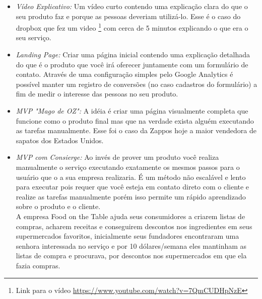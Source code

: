 \begin{itemize}
\item \emph{ Vídeo Explicativo:}
Um vídeo curto contendo uma explicação clara do que o seu produto faz e porque as pessoas deveriam utilizá-lo. Esse é o caso do dropbox que fez um video \footnote{Link para o vídeo  \url{https://www.youtube.com/watch?v=7QmCUDHpNzE}} com cerca de 5 minutos explicando o que era o seu serviço.
\item \emph{Landing Page:}
Criar uma página inicial contendo uma explicação detalhada do que é o produto que você irá oferecer juntamente com um formulário de contato. Através de uma configuração simples pelo Google Analytics é possível manter um registro de conversões (no caso cadastros do formulário)  a fim de medir o interesse das pessoas no seu produto.
\item \emph{MVP "Mago de OZ":}
A idéia é criar uma página visualmente completa que funcione como o produto final mas que na verdade  exista alguém  executando as tarefas manualmente. Esse foi o caso da Zappos hoje a maior vendedora de sapatos dos Estados Unidos.
\item \emph{ MVP com Consierge:}
Ao invés de prover um produto você realiza manualmente o serviço executando
exatamente os mesmos passos para o usuário que o a sua empresa realizaria. É um método não escalável e lento para executar pois requer que você esteja em contato direto com o cliente e realize as tarefas manualmente porém isso permite um rápido aprendizado sobre o produto e o cliente.
\\A empresa Food on the Table ajuda seus consumidores a criarem listas de compras, acharem receitas e conseguirem descontos nos ingredientes em seus supermercados favoritos, inicialmente seus fundadores encontraram uma senhora interessada no serviço e por 10 dólares/semana eles mantinham as listas de compra e procurava, por descontos nos supermercados em que ela fazia  compras.
\end{itemize}

